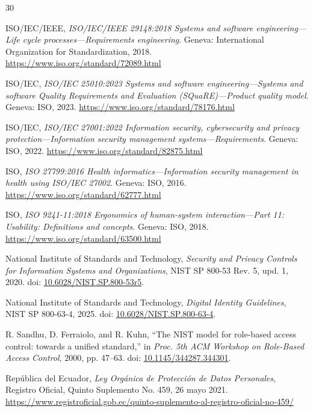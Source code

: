 \documentclass[11pt,a4paper]{article}
\begin{document}
	\begin{thebibliography}{30}
		
		ISO/IEC/IEEE, \emph{ISO/IEC/IEEE 29148:2018 Systems and software engineering---Life cycle processes---Requirements engineering}. Geneva: International Organization for Standardization, 2018. \url{https://www.iso.org/standard/72089.html}
		
		ISO/IEC, \emph{ISO/IEC 25010:2023 Systems and software engineering---Systems and software Quality Requirements and Evaluation (SQuaRE)---Product quality model}. Geneva: ISO, 2023. \url{https://www.iso.org/standard/78176.html}
		
		ISO/IEC, \emph{ISO/IEC 27001:2022 Information security, cybersecurity and privacy protection---Information security management systems---Requirements}. Geneva: ISO, 2022. \url{https://www.iso.org/standard/82875.html}
		
		ISO, \emph{ISO 27799:2016 Health informatics---Information security management in health using ISO/IEC 27002}. Geneva: ISO, 2016. \url{https://www.iso.org/standard/62777.html}
		
		ISO, \emph{ISO 9241-11:2018 Ergonomics of human-system interaction---Part 11: Usability: Definitions and concepts}. Geneva: ISO, 2018. \url{https://www.iso.org/standard/63500.html}
		
		National Institute of Standards and Technology, \emph{Security and Privacy Controls for Information Systems and Organizations}, NIST SP 800-53 Rev. 5, upd. 1, 2020. doi: \href{https://doi.org/10.6028/NIST.SP.800-53r5}{10.6028/NIST.SP.800-53r5}.
		
		National Institute of Standards and Technology, \emph{Digital Identity Guidelines}, NIST SP 800-63-4, 2025. doi: \href{https://doi.org/10.6028/NIST.SP.800-63-4}{10.6028/NIST.SP.800-63-4}.
		
		R. Sandhu, D. Ferraiolo, and R. Kuhn, ``The NIST model for role-based access control: towards a unified standard,'' in \emph{Proc. 5th ACM Workshop on Role-Based Access Control}, 2000, pp. 47--63. doi: \href{https://doi.org/10.1145/344287.344301}{10.1145/344287.344301}.
		
		República del Ecuador, \emph{Ley Orgánica de Protección de Datos Personales}, Registro Oficial, Quinto Suplemento No. 459, 26 mayo 2021. \url{https://www.registroficial.gob.ec/quinto-suplemento-al-registro-oficial-no-459/}
		

\end{thebibliography}
\end{document}
